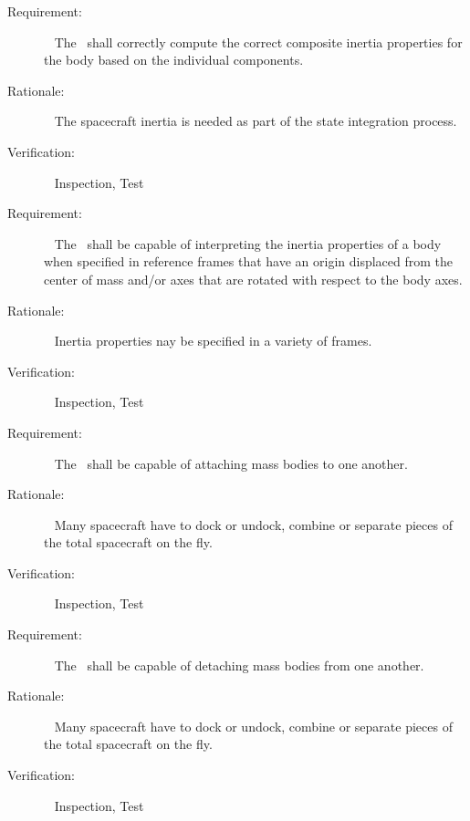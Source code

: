 \label{reqt:composite_inertia}
\begin{description}
  \item[Requirement:]\ \newline
     The \ModelDesc\ shall correctly compute the correct composite inertia
     properties for the body based on the individual components.
  \item[Rationale:]\ \newline
     The spacecraft inertia is needed as part of the state integration process.
  \item[Verification:]\ \newline
    Inspection, Test
\end{description}

\label{reqt:non_centroid_calc}
\begin{description}
   \item[Requirement:]\ \newline
     The \ModelDesc\ shall be capable of interpreting the inertia properties
     of a body when specified in reference frames that have an origin displaced from the center of mass and/or axes that are rotated with respect to the body axes.
  \item[Rationale:]\ \newline
     Inertia properties nay be specified in a variety of frames.
  \item[Verification:]\ \newline
    Inspection, Test
\end{description}

\label{reqt:attach}
\begin{description}
  \item[Requirement:]\ \newline
     The \ModelDesc\ shall be capable of attaching mass bodies
     to one another.
  \item[Rationale:]\ \newline
     Many spacecraft have to dock or undock, combine or separate pieces of the
     total spacecraft on the fly.
  \item[Verification:]\ \newline
    Inspection, Test
\end{description}


\label{reqt:detach}
\begin{description}
  \item[Requirement:]\ \newline
     The \ModelDesc\ shall be capable of detaching mass bodies
     from one another.
  \item[Rationale:]\ \newline
     Many spacecraft have to dock or undock, combine or separate pieces of the
     total spacecraft on the fly.
  \item[Verification:]\ \newline
    Inspection, Test
\end{description}

